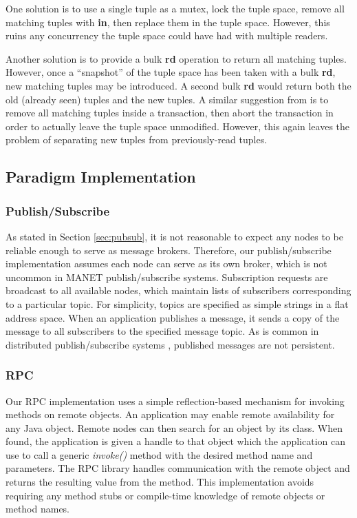 One solution is to use a single tuple as a mutex, lock the tuple space, remove all matching tuples with \textbf{in}, then replace them in the tuple space. However, this ruins any concurrency the tuple space could have had with multiple readers.

Another solution is to provide a bulk \textbf{rd} operation to return all matching tuples. However, once a ``snapshot'' of the tuple space has been taken with a bulk \textbf{rd}, new matching tuples may be introduced. A second bulk \textbf{rd} would return both the old (already seen) tuples and the new tuples. A similar suggestion from \cite{edwards2001jini} is to remove all matching tuples inside a transaction, then abort the transaction in order to actually leave the tuple space unmodified. However, this again leaves the problem of separating new tuples from previously-read tuples.

\subsection{Paradigm Implementation}

\subsubsection{Publish/Subscribe}

As stated in Section \ref{sec:pubsub}, it is not reasonable to expect any nodes to be reliable enough to serve as message brokers. Therefore, our publish/subscribe implementation assumes each node can serve as its own broker, which is not uncommon in MANET publish/subscribe systems\cite{psbrokers, psvsts}. Subscription requests are broadcast to all available nodes, which maintain lists of subscribers corresponding to a particular topic. For simplicity, topics are specified as simple strings in a flat address space. When an application publishes a message, it sends a copy of the message to all subscribers to the specified message topic. As is common in distributed publish/subscribe systems \cite{psfaces}, published messages are not persistent.

\subsubsection{RPC}

Our RPC implementation uses a simple reflection-based mechanism for invoking methods on remote objects. An application may enable remote availability for any Java object. Remote nodes can then search for an object by its class. When found, the application is given a handle to that object which the application can use to call a generic \textit{invoke()} method with the desired method name and parameters. The RPC library handles communication with the remote object and returns the resulting value from the method. This implementation avoids requiring any method stubs or compile-time knowledge of remote objects or method names.

